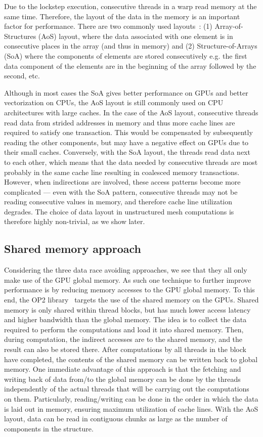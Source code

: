 Due to the lockstep execution, consecutive threads in a warp read  memory at
the same time. Therefore, the layout of the data in the memory is an important
factor for performance. There are two commonly used
layouts~\cite{sharma2015data}: (1) Array-of-Structures (AoS) layout, where the
data associated with one element is in consecutive places in the array (and thus
in memory) and (2) Structure-of-Arrays (SoA) where the components of elements
are stored consecutively e.g. the first data component of the elements are in
the beginning of the array followed by the second, etc.

Although in most cases the SoA gives better performance on GPUs and better
vectorization on CPUs, the AoS layout is still commonly used on CPU
architectures with large caches. In the case of the AoS layout, consecutive
threads read data from strided addresses in memory and thus more cache lines 
are required to satisfy one transaction. This would be compensated by 
subsequently reading the other components, but may have a negative effect on 
 GPUs due to their small caches. Conversely, with the SoA layout, the 
threads read data next to each other, which means that the data needed by 
consecutive threads are most probably in the same cache line resulting in 
coalesced memory transactions. However, when indirections are involved, these
access patterns become more complicated --- even with the SoA pattern,
consecutive threads may not be reading consecutive values in memory, and
therefore cache line utilization degrades. The choice of data layout in
unstructured mesh computations is therefore highly non-trivial, as we show
later.

\subsection{Shared memory approach}\label{shared-memory-approach}

Considering the three data race avoiding approaches, we see that they all only 
make use of the GPU global memory. As such one technique to further improve 
performance is by reducing memory accesses to the GPU global memory. To this 
end, the OP2 library~\cite{op2} targets the use of the shared memory on the 
GPUs. Shared memory is only shared within thread blocks, but has much lower 
access latency and higher bandwidth than the global memory. The idea is to 
collect the data required to perform the computations and load it into shared 
memory. Then, during computation, the indirect accesses are to the shared
memory, and the result can also be stored there. After computations by all 
threads in the block have completed, the contents of the shared memory can be 
written back to global memory. One immediate advantage of this approach is that 
the fetching and writing back of data from/to the global memory can be done by 
the threads independently of the actual threads that will be carrying out the 
computations on them. Particularly, reading/writing can be done in the order 
in which the data is laid out in memory, ensuring maximum utilization of 
cache lines. With the AoS layout, data can be read in contiguous chunks as 
large as the number of components in the structure.

